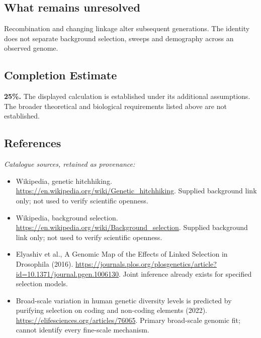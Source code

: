 \documentclass[11pt]{article}
\begin{document}
\subsection{What remains unresolved}
Recombination and changing linkage alter subsequent generations. The identity does not separate background selection, sweeps and demography across an observed genome.
\subsection{Completion Estimate}
\textbf{25\%.} The displayed calculation is established under its additional assumptions. The broader theoretical and biological requirements listed above are not established.
\subsection{References}
\noindent\emph{Catalogue sources, retained as provenance:}
\begin{itemize}
\item Wikipedia, genetic hitchhiking. \url{https://en.wikipedia.org/wiki/Genetic_hitchhiking}. Supplied background link only; not used to verify scientific openness.
\item Wikipedia, background selection. \url{https://en.wikipedia.org/wiki/Background_selection}. Supplied background link only; not used to verify scientific openness.
\item Elyashiv et al., A Genomic Map of the Effects of Linked Selection in Drosophila (2016). \url{https://journals.plos.org/plosgenetics/article?id=10.1371/journal.pgen.1006130}. Joint inference already exists for specified selection models.
\item Broad-scale variation in human genetic diversity levels is predicted by purifying selection on coding and non-coding elements (2022). \url{https://elifesciences.org/articles/76065}. Primary broad-scale genomic fit; cannot identify every fine-scale mechanism.
\end{itemize}
\clearpage


\appendix
\end{document}
